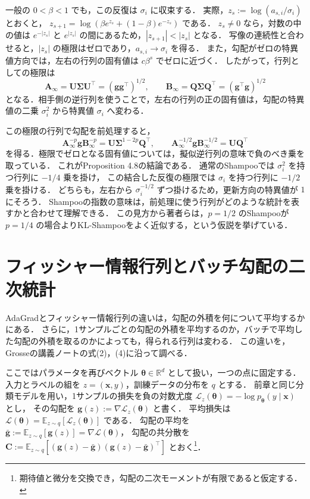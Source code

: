 \documentclass[../main.tex]{subfiles}
\begin{document}
一般の $0<\beta<1$ でも，この反復は $\sigma_i$ に収束する．
実際，$z_s:=\log(a_{s,i}/\sigma_i)$ とおくと，
$z_{s+1}=\log(\beta e^{z_s}+(1-\beta)e^{-z_s})$ である．
$z_s\ne0$ なら，対数の中の値は $e^{-|z_s|}$ と $e^{|z_s|}$ の間にあるため，$|z_{s+1}|<|z_s|$ となる．
写像の連続性と合わせると，$|z_s|$ の極限はゼロであり，$a_{s,i}\to\sigma_i$ を得る．
また，勾配がゼロの特異値方向では，左右の行列の固有値は $c\beta^s$ でゼロに近づく．
したがって，行列としての極限は
\begin{equation}
  \bm{A}_\infty=\bm{U}\bm{\Sigma}\bm{U}^\top
  =(\bm{g}\bm{g}^\top)^{1/2},\qquad
  \bm{B}_\infty=\bm{Q}\bm{\Sigma}\bm{Q}^\top
  =(\bm{g}^\top\bm{g})^{1/2}
  \label{eq:adagrad-coupled-shampoo-limit}
\end{equation}
となる．相手側の逆行列を使うことで，左右の行列の正の固有値は，勾配の特異値の二乗 $\sigma_i^2$ から特異値 $\sigma_i$ へ変わる．

この極限の行列で勾配を前処理すると，
\begin{equation}
  \bm{A}_\infty^{-p}\bm{g}\bm{B}_\infty^{-p}
  =\bm{U}\bm{\Sigma}^{1-2p}\bm{Q}^\top,
  \qquad
  \bm{A}_\infty^{-1/2}\bm{g}\bm{B}_\infty^{-1/2}
  =\bm{U}\bm{Q}^\top
  \label{eq:adagrad-coupled-shampoo-spectral}
\end{equation}
を得る．極限でゼロとなる固有値については，擬似逆行列の意味で負のべき乗を取っている．
これがProposition 4.8の結論である．
通常のShampooでは $\sigma_i^2$ を持つ行列に $-1/4$ 乗を掛け，
この結合した反復の極限では $\sigma_i$ を持つ行列に $-1/2$ 乗を掛ける．
どちらも，左右から $\sigma_i^{-1/2}$ ずつ掛けるため，更新方向の特異値が $1$ にそろう．
Shampooの指数の意味は，前処理に使う行列がどのような統計を表すかと合わせて理解できる．
この見方から著者らは，$p=1/2$ のShampooが $p=1/4$ の場合よりKL-Shampooをよく近似する，という仮説を挙げている．

\section{フィッシャー情報行列とバッチ勾配の二次統計}
\label{sec:adagrad-fisher-batch}

AdaGradとフィッシャー情報行列の違いは，勾配の外積を何について平均するかにある．
さらに，1サンプルごとの勾配の外積を平均するのか，バッチで平均した勾配の外積を取るのかによっても，得られる行列は変わる．
この違いを，Grosseの講義ノートの式(2)，(4)に沿って調べる\cite{grosse2021adaptive}．

ここではパラメータを再びベクトル $\bm{\theta}\in\mathbb{R}^d$ として扱い，一つの点に固定する．
入力とラベルの組を $z=(\bm{x},y)$，訓練データの分布を $q$ とする．
前章と同じ分類モデルを用い，1サンプルの損失を負の対数尤度 $\mathcal{L}_z(\bm{\theta})=-\log p_{\bm{\theta}}(y\mid\bm{x})$ とし，
その勾配を $\bm{g}(z):=\nabla\mathcal{L}_z(\bm{\theta})$ と書く．
平均損失は $\mathcal{L}(\bm{\theta})=\mathbb{E}_{z\sim q}[\mathcal{L}_z(\bm{\theta})]$ である．
勾配の平均を $\bar{\bm{g}}:=\mathbb{E}_{z\sim q}[\bm{g}(z)]=\nabla\mathcal{L}(\bm{\theta})$，
勾配の共分散を $\bm{C}:=\mathbb{E}_{z\sim q}[(\bm{g}(z)-\bar{\bm{g}})(\bm{g}(z)-\bar{\bm{g}})^\top]$ とおく\footnote{期待値と微分を交換でき，勾配の二次モーメントが有限であると仮定する．}．
\end{document}
